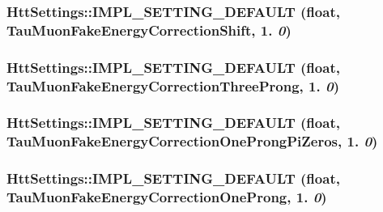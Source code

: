 \label{classHttSettings_a29def60556d711089d60d145a48b66fa}
\hypertarget{classHttSettings_a099ef27311d172e0a1bc4f218fe06f36}{
\subsubsection[{IMPL\_\-SETTING\_\-DEFAULT}]{\setlength{\rightskip}{0pt plus 5cm}HttSettings::IMPL\_\-SETTING\_\-DEFAULT (float, \/  TauMuonFakeEnergyCorrectionShift, \/  1. {\em 0})}}
\label{classHttSettings_a099ef27311d172e0a1bc4f218fe06f36}
\hypertarget{classHttSettings_a2d642e8ff52e663309a1fa01e4d5434e}{
\subsubsection[{IMPL\_\-SETTING\_\-DEFAULT}]{\setlength{\rightskip}{0pt plus 5cm}HttSettings::IMPL\_\-SETTING\_\-DEFAULT (float, \/  TauMuonFakeEnergyCorrectionThreeProng, \/  1. {\em 0})}}
\label{classHttSettings_a2d642e8ff52e663309a1fa01e4d5434e}
\hypertarget{classHttSettings_a60758c002601ce89d79abe088a533c4d}{
\subsubsection[{IMPL\_\-SETTING\_\-DEFAULT}]{\setlength{\rightskip}{0pt plus 5cm}HttSettings::IMPL\_\-SETTING\_\-DEFAULT (float, \/  TauMuonFakeEnergyCorrectionOneProngPiZeros, \/  1. {\em 0})}}
\label{classHttSettings_a60758c002601ce89d79abe088a533c4d}
\hypertarget{classHttSettings_a7a50f923a076ad48c0a43d64124fc9e2}{
\subsubsection[{IMPL\_\-SETTING\_\-DEFAULT}]{\setlength{\rightskip}{0pt plus 5cm}HttSettings::IMPL\_\-SETTING\_\-DEFAULT (float, \/  TauMuonFakeEnergyCorrectionOneProng, \/  1. {\em 0})}}
